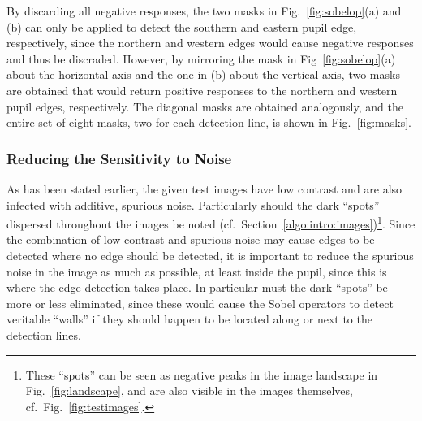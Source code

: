 By discarding all negative responses, the two masks in
Fig.~\ref{fig:sobelop}(a) and (b) can only be applied to detect the
southern and eastern pupil edge, respectively, since the northern and
western edges would cause negative responses and thus be discraded.
However, by mirroring the mask in Fig~\ref{fig:sobelop}(a) about the
horizontal axis and the one in (b) about the vertical axis, two masks
are obtained that would return positive responses to the northern and
western pupil edges, respectively.  The diagonal masks are obtained
analogously, and the entire set of eight masks, two for each detection
line, is shown in Fig.~\ref{fig:masks}.


\subsubsection{Reducing the Sensitivity to Noise}

As has been stated earlier, the given test images have low contrast
and are also infected with additive, spurious noise.  Particularly
should the dark ``spots'' dispersed throughout the images be noted
(cf.\ Section~\ref{algo:intro:images})\footnote{These ``spots'' can be
  seen as negative peaks in the image landscape in
  Fig.~\ref{fig:landscape}, and are also visible in the images
  themselves, cf.\ Fig.~\ref{fig:testimages}.}.  Since the combination
of low contrast and spurious noise may cause edges to be detected
where no edge should be detected, it is important to reduce the
spurious noise in the image as much as possible, at least inside the
pupil, since this is where the edge detection takes place.
In particular must the dark ``spots'' be more or less eliminated,
since these would cause the Sobel operators to detect veritable
``walls'' if they should happen to be located along or next to the
detection lines.

